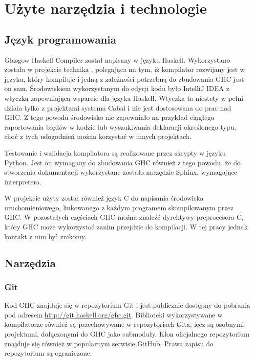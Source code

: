 \chapter{Użyte narzędzia i technologie}\label{chap:technologie}

\section{Język programowania}\label{sec:jezyk_programowania}

Glasgow Haskell Compiler został napisany w języku Haskell. Wykorzystano została
w projekcie technika , polegająca na tym, iż kompilator
rozwijany jest w języku, który kompiluje i jedną z zależności potrzebną do
zbudowania GHC jest on sam. Środowiskiem wykorzystanym do edycji kodu było
IntelliJ IDEA z wtyczką zapewniającą wsparcie dla języka Haskell. Wtyczka ta
niestety w pełni działa tylko z projektami systemu Cabal i nie jest dostosowana
do prac nad GHC. Z tego powodu środowisko nie zapewniało na przykład ciągłego
raportowania błędów w kodzie lub wyszukiwania deklaracji określonego typu, choć
z tych udogodnień można korzystać w innych projektach.

Testowanie i walidacja kompilatora są realizowane przez skrypty w języku
Python. Jest on wymagany do zbudowania GHC
również z tego powodu, że do stworzenia dokumentacji wykorzystane zostało
narzędzie Sphinx, wymagające interpretera.

W projekcie użyty został również język C do napisania środowiska
uruchomieniowego, linkowanego z każdym programem skompilowanym przez GHC. W
pozostałych częściach GHC można znaleźć dyrektywy preprocesora C, który GHC może
wykorzystać zanim przejdzie do kompilacji. W tej pracy jednak kontakt z nim był
znikomy.

\section{Narzędzia}

\subsection{Git}

Kod GHC znajduje się w repozytorium Git i jest publicznie dostępny do
pobrania pod adresem \url{http://git.haskell.org/ghc.git}.
Biblioteki wykorzystywane w kompilatorze również są przechowywane w
repozytoriach Gita, lecz są osobnymi projektami, dołączonymi do GHC jako
submoduły. Klon oficjalnego repozytorium znajduje się również w popularnym
serwisie GitHub. Prawa zapisu do repozytorium są
ograniczone\cite{WikiGettingTheSources}.

